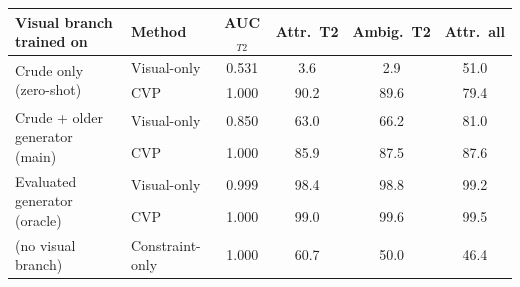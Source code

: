 \begin{tabular}{llcccc}
\toprule
Visual branch trained on & Method & AUC$_{T2}$ & Attr.\ T2 & Ambig.\ T2 & Attr.\ all\\
\midrule
\multirow{2}{*}{Crude only (zero-shot)} & Visual-only & 0.531 & 3.6 & 2.9 & 51.0\\
 & CVP & 1.000 & 90.2 & 89.6 & 79.4\\
\midrule
\multirow{2}{*}{Crude + older generator (main)} & Visual-only & 0.850 & 63.0 & 66.2 & 81.0\\
 & CVP & 1.000 & 85.9 & 87.5 & 87.6\\
\midrule
\multirow{2}{*}{Evaluated generator (oracle)} & Visual-only & 0.999 & 98.4 & 98.8 & 99.2\\
 & CVP & 1.000 & 99.0 & 99.6 & 99.5\\
\midrule
(no visual branch) & Constraint-only & 1.000 & 60.7 & 50.0 & 46.4\\
\bottomrule
\end{tabular}
